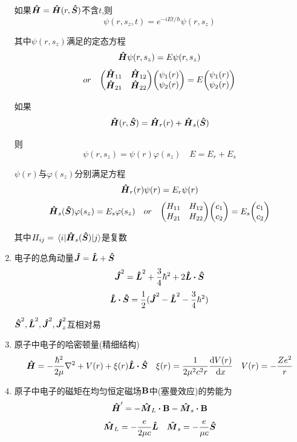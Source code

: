 \begin{formal}
\begin{enumerate}
                  如果$\vu*{H} = \vu*{H}(r,\vu*{S})$不含$t$,则
                  $$ \psi(r,s_{z},t) = e^{-iEt/\hbar} \psi(r,s_{z}) $$

                  其中$\psi(r,s_{z})$满足的定态方程
                  $$ \vu*{H} \psi(r,s_{z}) = E \psi(r,s_{z}) $$
                  $$ 
                  or \quad \mqty(\vu*{H}_{11} & \vu*{H}_{12} \\ \vu*{H}_{21} & \vu*{H}_{22}) 
                  \mqty(\psi_{1}(r) \\ \psi_{2}(r)) = E \mqty( \psi_{1}(r) \\ \psi_{2}(r) )
                  $$

                  如果
                  $$ \vu*{H}(r,\vu*{S}) = \vu*{H}_{r}(r) + \vu*{H}_{s}(\vu*{S})  $$

                  则
                  $$ \psi(r,s_{z}) = \psi(r)\varphi(s_{z}) \quad E = E_{r} + E_{s} $$

                  $\psi(r)$与$\varphi(s_{z})$分别满足方程
                  $$ \vu*{H}_{r}(r) \psi(r) = E_{r}\psi(r) $$
                  $$ 
                  \vu*{H}_{s}(\vu*{S}) \varphi(s_{z}) = E_{s} \varphi(s_{z}) \quad or \quad 
                  \mqty(H_{11} & H_{12} \\ H_{21} & H_{22}) \mqty(c_{1} \\ c_{2}) = E_{s} \mqty(c_{1} \\ c_{2})
                  $$

                  其中$ H_{ij} = \mel{i}{\vu*{H}_{s}(\vu*{S})}{j}$是复数

                  \item 电子的总角动量$ \vu*{J} = \vu*{L} + \vu*{S} $
                  $$
                  \vu*{J}^{2} = \vu*{L}^{2} + \frac{3}{4} \hbar^{2} + 2\vu*{L} \vdot \vu*{S}
                  $$
                  $$
                  \vu*{L} \vdot \vu*{S} = \frac{1}{2} (\vu*{J}^{2} - \vu*{L}^{2} - \frac{3}{4}\hbar^{2} )
                  $$

                  $\vu*{S}^{2},\vu*{L}^{2},\vu*{J}^{2},\vu*{J}_{z}^{2}$互相对易

            \item 原子中电子的哈密顿量(精细结构)
                  $$ 
                  \vu*{H} = -\frac{\hbar^{2}}{2\mu}\nabla^{2} + V(r) + \xi(r) \vu*{L} \vdot \vu*{S} \quad 
                  \xi(r) = \frac{1}{2\mu^{2}c^{2}r}\dv{V(r)}{x} \quad V(r) = -\frac{Ze^{2}}{r}  
                  $$

            \item 原子中电子的磁矩在均匀恒定磁场$\vb{B}$中(塞曼效应)的势能为
                  $$
                  \vu*{H}' = - \vu*{M}_{L} \vdot \vb{B} - \vu*{M}_{s} \vdot \vb{B}
                  $$
                  $$
                  \vu*{M}_{L} = -\frac{e}{2\mu c}\vu*{L} \quad \vu*{M}_{s} = - \frac{e}{\mu c}\vu*{S}
                  $$


\end{enumerate}
\end{formal}
